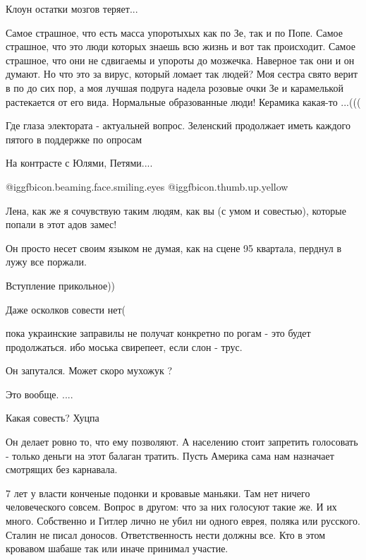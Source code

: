 \begin{itemize}
Клоун остатки мозгов теряет...


Самое страшное, что есть масса упоротыхых как по Зе, так и по Попе. Самое
страшное, что это люди которых знаешь всю жизнь и вот так происходит. Самое
страшное, что они не сдвигаемы и упороты до мозжечка. Наверное так они и он
думают. Но что это за вирус, который ломает так людей? Моя сестра свято верит в
по до сих пор, а моя лучшая подруга надела розовые очки Зе и карамелькой
растекается от его вида. Нормальные образованные люди! Керамика какая-то ...(((

Где глаза электората - актуальней вопрос.
Зеленский продолжает иметь каждого пятого в поддержке по опросам

\begin{itemize} %
На контрасте с Юлями, Петями....
\end{itemize} %

 @igg{fbicon.beaming.face.smiling.eyes}  @igg{fbicon.thumb.up.yellow} 

Лена, как же я сочувствую таким людям, как вы (с умом и совестью), которые попали в этот адов замес!

Он просто несет своим языком не думая, как на сцене 95 квартала, перднул в лужу все поржали.

Вступление прикольное))

Даже осколков совести нет(

пока украинские заправилы не получат конкретно по рогам - это будет продолжаться. ибо моська свирепеет, если слон - трус.

Он запутался. Может скоро мухожук ?

Это вообще. ....

Какая совесть?
Хуцпа


Он делает ровно то, что ему позволяют. А населению стоит запретить голосовать -
только деньги на этот балаган тратить. Пусть Америка сама нам назначает
смотрящих без карнавала.


7 лет у власти конченые подонки и кровавые маньяки. Там нет ничего
человеческого совсем. Вопрос в другом: что за них голосуют такие же. И их
много. Собственно и Гитлер лично не убил ни одного еврея, поляка или русского.
Сталин не писал доносов. Ответственность нести должны все. Кто в этом кровавом
шабаше так или иначе принимал участие.


\end{itemize}

